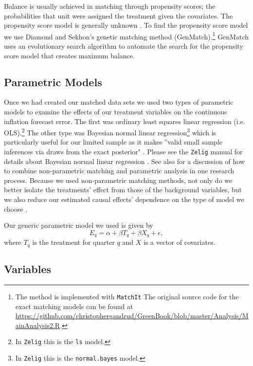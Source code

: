 \documentclass[a4paper]{article}\usepackage{graphicx, color}
\begin{document}
Balance is usually achieved in matching through propensity scores; the probabilities that unit were assigned the treatment given the covariates. The propensity score model is generally unknown \cite{Drake1993}. To find the propensity score model we use Diamond and Sekhon's \citeyearpar{Diamond2012} genetic matching method (GenMatch).\footnote{The method is implemented with {\tt{MatchIt}} The original source code for the exact matching models can be found at {\url{https://github.com/christophergandrud/GreenBook/blob/master/Analysis/MainAnalysis2.R}}.} GenMatch uses an evolutionary search algorithm to automate the search for the propensity score model that creates maximum balance.


\subsection{Parametric Models}

Once we had created our matched data sets we used two types of parametric models to examine the effects of our treatment variables on the continuous inflation forecast error. The first was ordinary least squares linear regression (i.e. OLS).\footnote{In {\tt{Zelig}} this is the {\tt{ls}} model.} The other type was Bayesian normal linear regression\footnote{In {\tt{Zelig}} this is the {\tt{normal.bayes}} model.} which is particularly useful for our limited sample as it makes ''valid small sample inferences via draws from the exact posterior" \citep[][38]{Zelig2012}. Please see the {\tt{Zelig}} manual for details about Bayesian normal linear regression \citep{Goodrich2007}.  See also \cite{Imai2008} for a discussion of how to combine non-parametric matching and parametric analysis in one research process. Because we used non-parametric matching methods, not only do we better isolate the treatments' effect from those of the background variables, but we also reduce our estimated causal effects' dependence on the type of model we choose \cite[200--201]{Ho2007}.

Our generic parametric model we used is given by
%
\begin{equation}
    E_{q} = \alpha + \beta T_{q} + \beta X_{q} + \epsilon,
\end{equation}
%
where $T_{q}$ is the treatment for quarter $q$ and $X$ is a vector of covariates. 

\subsection{Variables}
\end{document}
